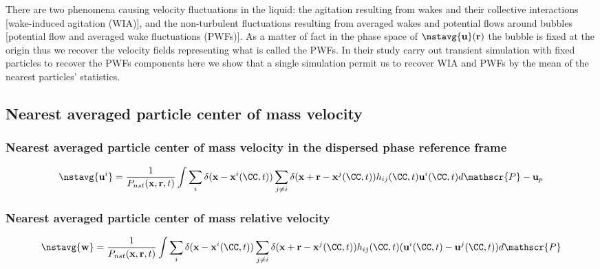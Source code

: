 There are two phenomena causing velocity fluctuations in the liquid:
the agitation resulting from wakes and their collective interactions [wake-induced agitation (WIA)], and the non-turbulent fluctuations resulting from averaged wakes and potential flows around bubbles [potential flow and averaged wake fluctuations (PWFs)].
As a matter of fact in the phase space of $\nstavg{\textbf{u}}(\textbf{r})$ the bubble is fixed at the origin thus we recover the velocity fields representing what is called the PWFs. 
In their study \citet{du2022analysis} carry out transient simulation with fixed particles to recover the PWFs components here we show that a single simulation permit us to recover WIA and PWFs by the mean of the nearest particles' statistics. 






\subsection{Nearest averaged particle center of mass velocity}
\subsubsection{Nearest averaged particle center of mass velocity in the dispersed phase reference frame}
\begin{equation}
    \nstavg{\textbf{u}^i}=\frac{1}{P_{nst}(\textbf{x},\textbf{r},t)} 
    \int \sum_{i}\delta(\textbf{x}-\textbf{x}^i(\CC,t))
    \sum_{j\neq i}\delta(\textbf{x}+\textbf{r}-\textbf{x}^j(\CC,t)) 
    h_{ij}(\CC,t) 
    \textbf{u}^i(\CC,t)
    d\mathscr{P} 
    - \textbf{u}_p
\end{equation}
\subsubsection{Nearest averaged particle center of mass relative velocity}
\begin{equation}
    \nstavg{\textbf{w}}=\frac{1}{P_{nst}(\textbf{x},\textbf{r},t)} 
    \int \sum_{i}\delta(\textbf{x}-\textbf{x}^i(\CC,t))
    \sum_{j\neq i}\delta(\textbf{x}+\textbf{r}-\textbf{x}^j(\CC,t)) 
    h_{ij}(\CC,t) 
    (\textbf{u}^i(\CC,t) - \textbf{u}^j(\CC,t))
    d\mathscr{P} 
\end{equation}


